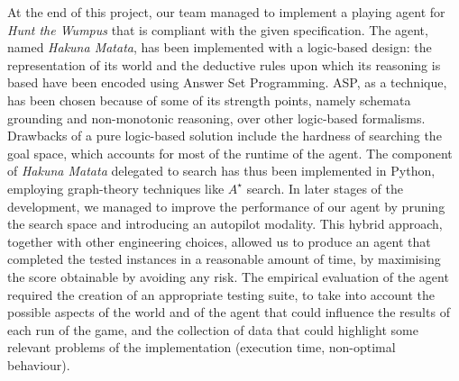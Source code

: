 \documentclass{llncs}
\newcommand{\htw}{\emph{Hunt the Wumpus}\xspace}
\newcommand{\hm}{\emph{Hakuna Matata}\xspace}
\begin{document}
At the end of this project, our team managed to implement a playing agent for \htw that is compliant with the given specification.
The agent, named \hm, has been implemented with a logic-based design: the representation of its world and the deductive rules upon which its reasoning is based have been encoded using Answer Set Programming.
ASP, as a technique, has been chosen because of some of its strength points, namely schemata grounding and non-monotonic reasoning, over other logic-based formalisms.
Drawbacks of a pure logic-based solution include the hardness of searching the goal space, which accounts for most of the runtime of the agent.
The component of \hm delegated to search has thus been implemented in Python, employing graph-theory techniques like $A^{\star}$ search.
In later stages of the development, we managed to improve the performance of our agent by pruning the search space and introducing an autopilot modality.
This hybrid approach, together with other engineering choices, allowed us to produce an agent that completed the tested instances in a reasonable amount of time, by maximising the score obtainable by avoiding any risk.
The empirical evaluation of the agent required the creation of an appropriate testing suite, to take into account the possible aspects of the world and of the agent that could influence the results of each run of the game, and the collection of data that could highlight some relevant problems of the implementation (execution time, non-optimal behaviour).
\end{document}
